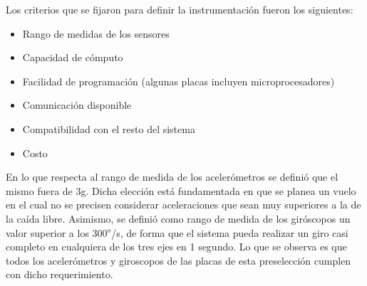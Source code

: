 \documentclass[main]{subfiles}
\begin{document}
Los criterios que se fijaron para definir la instrumentaci\'on fueron los siguientes:
\begin{itemize}
\item
Rango de medidas de los sensores
\item
Capacidad de c\'omputo
\item
Facilidad de programaci\'on (algunas placas incluyen microprocesadores)
\item
Comunicaci\'on disponible 
\item
Compatibilidad con el resto del sistema
\item
Costo
\end{itemize}

En lo que respecta al rango de medida de los aceler\'ometros se defini\'o que el mismo fuera de 3g. Dicha elecci\'on est\'a fundamentada en que se planea un vuelo en el cual no se precisen considerar aceleraciones que sean muy superiores a la de la ca\'ida libre.  Asimismo, se defini\'o como rango de medida de los gir\'oscopos un valor  superior a los 300$^o$/s, de forma que el sistema pueda realizar un giro casi completo en cualquiera de los tres ejes en 1 segundo. 
Lo que se observa es que todos los aceler\'ometros y giroscopos de las placas de esta preselecci\'on cumplen con dicho requerimiento.
\end{document}
